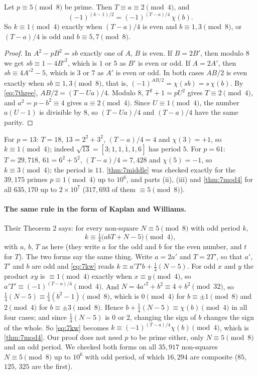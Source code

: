 \begin{theorem}\label{thm:7mod4}
Let $p\equiv5\pmod8$ be prime. Then $T\equiv a\equiv2\pmod4$, and
\[
  (-1)^{(k-1)/2}=(-1)^{(T-a)/4}\,\chi(b).
\]
So $k\equiv1\pmod4$ exactly when $(T-a)/4$ is even and $b\equiv1,3\pmod8$, or $(T-a)/4$ is odd and
$b\equiv5,7\pmod8$.
\end{theorem}

\begin{proof}
In $A^{2}-pB^{2}=sb$ exactly one of $A$, $B$ is even. If $B=2B'$, then modulo $8$ we get
$sb\equiv1-4B'^{2}$, which is $1$ or $5$ as $B'$ is even or odd. If $A=2A'$, then $sb\equiv4A'^{2}-5$,
which is $3$ or $7$ as $A'$ is even or odd. In both cases $AB/2$ is even exactly when
$sb\equiv1,3\pmod8$, that is, $(-1)^{AB/2}=\chi(sb)=s\,\chi(b)$. By
\eqref{eq:7three}, $AB/2=(T-Ua)/4$. Modulo $8$, $T^{2}+1=pU^{2}$ gives $T\equiv2\pmod4$, and
$a^{2}=p-b^{2}\equiv4$ gives $a\equiv2\pmod4$. Since $U\equiv1\pmod4$, the number $a(U-1)$ is divisible
by $8$, so $(T-Ua)/4$ and $(T-a)/4$ have the same parity.
\end{proof}

For $p=13$: $T=18$, $13=2^{2}+3^{2}$, $(T-a)/4=4$ and $\chi(3)=+1$, so $k\equiv1\pmod4$;
indeed $\sqrt{13}=[3;\overline{1,1,1,1,6}]$ has period $5$. For $p=61$: $T=29{,}718$,
$61=6^{2}+5^{2}$, $(T-a)/4=7{,}428$ and $\chi(5)=-1$, so $k\equiv3\pmod4$; the period is
$11$. \cref{thm:7middle} was checked exactly for the $39{,}175$ primes $p\equiv1\pmod4$ up to
$10^{6}$, and parts (ii), (iii) and \cref{thm:7mod4} for all $635{,}170$ up to $2\times10^{7}$
($317{,}693$ of them $\equiv5\pmod8$).

\paragraph{The same rule in the form of Kaplan and Williams.} Their Theorem 2 \citep[p.~179]{KaplanWilliams1986} says:
for every non-square $N\equiv5\pmod8$ with odd period $k$,
\begin{equation}\label{eq:7kw}
  k\equiv\tfrac14\bigl(abT+N-5\bigr)\pmod 4 ,
\end{equation}
with $a$, $b$, $T$ as here (they write $a$ for the odd and $b$ for the even number, and $t$ for $T$).
The two forms say the same thing. Write $a=2a'$ and $T=2T'$, so that $a'$,
$T'$ and $b$ are odd and \eqref{eq:7kw} reads $k\equiv a'T'b+\tfrac14(N-5)$. For odd $x$ and $y$ the
product $xy$ is $\equiv1\pmod4$ exactly when $x\equiv y\pmod4$, so $a'T'\equiv(-1)^{(T-a)/4}\pmod4$. And
$N=4a'^{2}+b^{2}\equiv4+b^{2}\pmod{32}$, so $\tfrac14(N-5)\equiv\tfrac14(b^{2}-1)\pmod8$, which is
$0\pmod4$ for $b\equiv\pm1\pmod8$ and $2\pmod4$ for $b\equiv\pm3\pmod8$. Hence
$b+\tfrac14(N-5)\equiv\chi(b)\pmod4$ in all four cases; and since $\tfrac14(N-5)$ is $0$ or $2$, changing
the sign of $b$ changes the sign of the whole. So \eqref{eq:7kw} becomes
$k\equiv(-1)^{(T-a)/4}\chi(b)\pmod4$, which is \cref{thm:7mod4}. Our proof does not need $p$ to be
prime either, only $N\equiv5\pmod8$ and an odd period. We checked both forms on all $35{,}917$
non-squares $N\equiv5\pmod8$ up to $10^{6}$ with odd period, of which $16{,}294$ are composite ($85$,
$125$, $325$ are the first).

